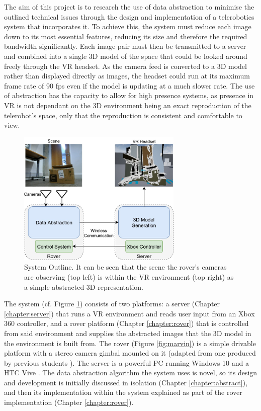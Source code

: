 The aim of this project is to research the use of data abstraction to minimise the outlined technical issues through the design and implementation of a telerobotics system that incorporates it. To achieve this, the system must reduce each image down to its most essential features, reducing its size and therefore the required bandwidth significantly. Each image pair must then be transmitted to a server and combined into a single 3D model of the space that could be looked around freely through the VR headset. As the camera feed is converted to a 3D model rather than displayed directly as images, the headset could run at its maximum frame rate of 90 fps even if the model is updating at a much slower rate. The use of abstraction has the capacity to allow for high presence systems, as presence in VR is not dependant on the 3D environment being an exact reproduction of the telerobot's space, only that the reproduction is consistent and comfortable to view. 

\begin{figure}[H]
    \begin{center}
      \includegraphics[width=0.7\textwidth]{Figures/Outline.jpg}
      \caption[System Outline]{System Outline. It can be seen that the scene the rover's cameras are observing (top left) is within the VR environment (top right) as a simple abstracted 3D representation.}
      \label{fig:outline}
    \end{center}
\end{figure}

The system (cf. Figure \ref{fig:outline}) consists of two platforms: a server (Chapter \ref{chapter:server}) that runs a VR environment and reads user input from an Xbox 360 controller, and a rover platform (Chapter \ref{chapter:rover}) that is controlled from said environment and supplies the abstracted images that the 3D model in the environment is built from. The rover (Figure \ref{fig:marvin}) is a simple drivable platform with a stereo camera gimbal mounted on it (adapted from one produced by previous students \cite{gimble}). The server is a powerful PC running Windows 10 \cite{windows} and a HTC Vive \cite{Vive}. The data abstraction algorithm the system uses is novel, so its design and development is initially discussed in isolation (Chapter \ref{chapter:abstract}), and then its implementation within the system explained as part of the rover implementation (Chapter \ref{chapter:rover}).

